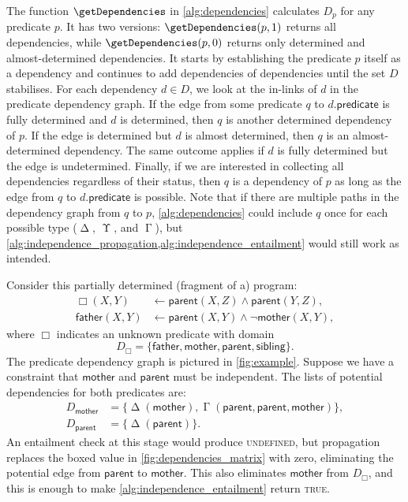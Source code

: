 \documentclass[runningheads]{llncs}
\DeclareMathOperator{\Determined}{\Delta}
\DeclareMathOperator{\Undetermined}{\Upsilon}
\DeclareMathOperator{\AlmostDetermined}{\Gamma}
\begin{document}
The function $\getDependencies$ in \cref{alg:dependencies} calculates $D_p$ for
any predicate $p$. It has two versions: $\getDependencies(p, 1)$ returns all
dependencies, while $\getDependencies(p, 0)$ returns only determined and
almost-determined dependencies. It starts by establishing the predicate $p$
itself as a dependency and continues to add dependencies of dependencies until
the set $D$ stabilises. For each dependency $d \in D$, we look at the in-links
of $d$ in the predicate dependency graph. If the edge from some predicate $q$ to
$d.\mathsf{predicate}$ is fully determined and $d$ is determined, then $q$ is
another determined dependency of $p$. If the edge is determined but $d$ is
almost determined, then $q$ is an almost-determined dependency. The same outcome
applies if $d$ is fully determined but the edge is undetermined. Finally, if we
are interested in collecting all dependencies regardless of their status, then
$q$ is a dependency of $p$ as long as the edge from $q$ to
$d.\mathsf{predicate}$ is possible. Note that if there are multiple paths in the
dependency graph from $q$ to $p$, \cref{alg:dependencies} could include $q$ once
for each possible type ($\Determined$, $\Undetermined$, and
$\AlmostDetermined$), but
\cref{alg:independence_propagation,alg:independence_entailment} would still work
as intended.

\begin{example} \label{example:independence}
  Consider this partially determined (fragment of a) program:
  \begin{align*}
    \Box(X, Y) &\gets \mathsf{parent}(X, Z) \land \mathsf{parent}(Y, Z),\\
    \mathsf{father}(X, Y) &\gets \mathsf{parent}(X, Y) \land \neg\mathsf{mother}(X, Y),
  \end{align*}
  where $\Box$ indicates an unknown predicate with domain
  \[
    D_\Box = \{ \mathsf{father}, \mathsf{mother}, \mathsf{parent},
    \mathsf{sibling} \}.
  \]
  The predicate dependency graph is pictured in \cref{fig:example}. Suppose we
  have a constraint that $\mathsf{mother}$ and $\mathsf{parent}$ must be
  independent. The lists of potential dependencies for both predicates are:
  \begin{align*}
    D_{\mathsf{mother}} &= \{ \Determined(\mathsf{mother}), \AlmostDetermined(\mathsf{parent}, \mathsf{parent}, \mathsf{mother}) \}, \\
    D_{\mathsf{parent}} &= \{ \Determined(\mathsf{parent}) \}.
  \end{align*}
  An entailment check at this stage would produce \textsc{undefined}, but
  propagation replaces the boxed value in \cref{fig:dependencies_matrix} with
  zero, eliminating the potential edge from $\mathsf{parent}$ to
  $\mathsf{mother}$. This also eliminates $\mathsf{mother}$ from $D_\Box$, and
  this is enough to make \cref{alg:independence_entailment} return
  \textsc{true}.
\end{example}
\end{document}
